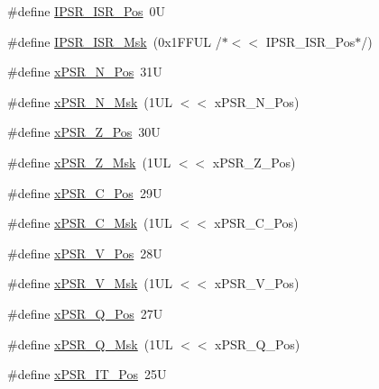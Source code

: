 \begin{DoxyCompactItemize}
\item 
\#define \mbox{\hyperlink{group___c_m_s_i_s___c_o_r_e_ga0e34027584d02c43811ae908a5ca9adf}{I\+P\+S\+R\+\_\+\+I\+S\+R\+\_\+\+Pos}}~0U
\item 
\#define \mbox{\hyperlink{group___c_m_s_i_s___c_o_r_e_gaf013a4579a64d1f21f56ea9f1b33ab56}{I\+P\+S\+R\+\_\+\+I\+S\+R\+\_\+\+Msk}}~(0x1\+F\+F\+U\+L /$\ast$$<$$<$ I\+P\+S\+R\+\_\+\+I\+S\+R\+\_\+\+Pos$\ast$/)
\item 
\#define \mbox{\hyperlink{group___c_m_s_i_s___c_o_r_e_ga031eb1b8ebcdb3d602d0b9f2ec82a7ae}{x\+P\+S\+R\+\_\+\+N\+\_\+\+Pos}}~31U
\item 
\#define \mbox{\hyperlink{group___c_m_s_i_s___c_o_r_e_gaf600f4ff41b62cf2f3b0a59b6d2e93d6}{x\+P\+S\+R\+\_\+\+N\+\_\+\+Msk}}~(1\+U\+L $<$$<$ x\+P\+S\+R\+\_\+\+N\+\_\+\+Pos)
\item 
\#define \mbox{\hyperlink{group___c_m_s_i_s___c_o_r_e_ga5869dd608eea73c80f0567d781d2230b}{x\+P\+S\+R\+\_\+\+Z\+\_\+\+Pos}}~30U
\item 
\#define \mbox{\hyperlink{group___c_m_s_i_s___c_o_r_e_ga907599209fba99f579778e662021c4f2}{x\+P\+S\+R\+\_\+\+Z\+\_\+\+Msk}}~(1\+U\+L $<$$<$ x\+P\+S\+R\+\_\+\+Z\+\_\+\+Pos)
\item 
\#define \mbox{\hyperlink{group___c_m_s_i_s___c_o_r_e_ga14adb79b91f6634b351a1b57394e2db6}{x\+P\+S\+R\+\_\+\+C\+\_\+\+Pos}}~29U
\item 
\#define \mbox{\hyperlink{group___c_m_s_i_s___c_o_r_e_ga21e2497255d380f956ca0f48d11d0775}{x\+P\+S\+R\+\_\+\+C\+\_\+\+Msk}}~(1\+U\+L $<$$<$ x\+P\+S\+R\+\_\+\+C\+\_\+\+Pos)
\item 
\#define \mbox{\hyperlink{group___c_m_s_i_s___c_o_r_e_gae0cfbb394490db402623d97e6a979e00}{x\+P\+S\+R\+\_\+\+V\+\_\+\+Pos}}~28U
\item 
\#define \mbox{\hyperlink{group___c_m_s_i_s___c_o_r_e_gab07f94ed3b6ee695f5af719dc27995c2}{x\+P\+S\+R\+\_\+\+V\+\_\+\+Msk}}~(1\+U\+L $<$$<$ x\+P\+S\+R\+\_\+\+V\+\_\+\+Pos)
\item 
\#define \mbox{\hyperlink{group___c_m_s_i_s___c_o_r_e_gaabb4178d50676a8f19cf8f727f38ace8}{x\+P\+S\+R\+\_\+\+Q\+\_\+\+Pos}}~27U
\item 
\#define \mbox{\hyperlink{group___c_m_s_i_s___c_o_r_e_ga133ac393c38559ae43ac36383e731dd4}{x\+P\+S\+R\+\_\+\+Q\+\_\+\+Msk}}~(1\+U\+L $<$$<$ x\+P\+S\+R\+\_\+\+Q\+\_\+\+Pos)
\item 
\#define \mbox{\hyperlink{group___c_m_s_i_s___c_o_r_e_gac5be1db1343f776ecd00f0a4ebe70a46}{x\+P\+S\+R\+\_\+\+I\+T\+\_\+\+Pos}}~25U
\item 
$$
\end{DoxyCompactItemize}
